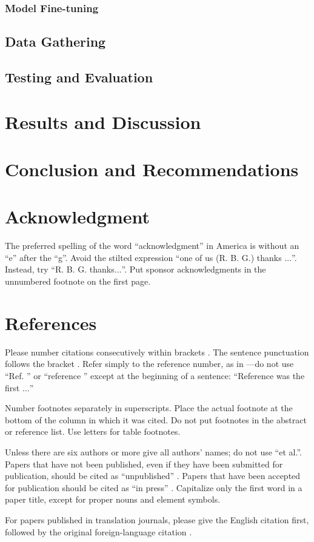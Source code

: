 \documentclass[conference]{IEEEtran}
\begin{document}
        \subsubsection{Model Fine-tuning}
    \subsection{Data Gathering}
    \subsection{Testing and Evaluation}

\section{Results and Discussion}
\section{Conclusion and Recommendations}

\section*{Acknowledgment}

The preferred spelling of the word ``acknowledgment'' in America is without 
an ``e'' after the ``g''. Avoid the stilted expression ``one of us (R. B. 
G.) thanks $\ldots$''. Instead, try ``R. B. G. thanks$\ldots$''. Put sponsor 
acknowledgments in the unnumbered footnote on the first page.

\section*{References}

Please number citations consecutively within brackets \cite{b1}. The 
sentence punctuation follows the bracket \cite{b2}. Refer simply to the reference 
number, as in \cite{b3}---do not use ``Ref. \cite{b3}'' or ``reference \cite{b3}'' except at 
the beginning of a sentence: ``Reference \cite{b3} was the first $\ldots$''

Number footnotes separately in superscripts. Place the actual footnote at 
the bottom of the column in which it was cited. Do not put footnotes in the 
abstract or reference list. Use letters for table footnotes.

Unless there are six authors or more give all authors' names; do not use 
``et al.''. Papers that have not been published, even if they have been 
submitted for publication, should be cited as ``unpublished'' \cite{b4}. Papers 
that have been accepted for publication should be cited as ``in press'' \cite{b5}. 
Capitalize only the first word in a paper title, except for proper nouns and 
element symbols.

For papers published in translation journals, please give the English 
citation first, followed by the original foreign-language citation \cite{b6}.
\end{document}

